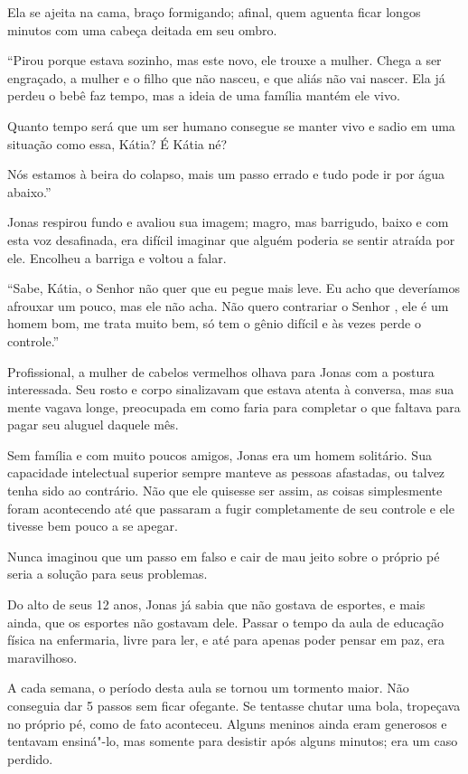 Ela se ajeita na cama, braço formigando; afinal, quem aguenta ficar
longos minutos com uma cabeça deitada em seu ombro.

``Pirou porque estava sozinho, mas este novo, ele trouxe a mulher. Chega
a ser engraçado, a mulher e o filho que não nasceu, e que aliás não vai
nascer. Ela já perdeu o bebê faz tempo, mas a ideia de uma família
mantém ele vivo.

Quanto tempo será que um ser humano consegue se manter vivo e sadio em
uma situação como essa, Kátia? É Kátia né?

Nós estamos à beira do colapso, mais um passo errado e tudo pode ir por
água abaixo.''

Jonas respirou fundo e avaliou sua imagem; magro, mas barrigudo, baixo e
com esta voz desafinada, era difícil imaginar que alguém poderia se
sentir atraída por ele. Encolheu a barriga e voltou a falar.

``Sabe, Kátia, o Senhor  não quer que eu pegue mais leve. Eu acho que
deveríamos afrouxar um pouco, mas ele não acha. Não quero contrariar o
Senhor , ele é um homem bom, me trata muito bem, só tem
o gênio difícil e às vezes perde o controle.''

Profissional, a mulher de cabelos vermelhos olhava para Jonas com a
postura interessada. Seu rosto e corpo sinalizavam que estava atenta à
conversa, mas sua mente vagava longe, preocupada em como faria para
completar o que faltava para pagar seu aluguel daquele mês.

Sem família e com muito poucos amigos, Jonas era um homem solitário. Sua
capacidade intelectual superior sempre manteve as pessoas afastadas, ou
talvez tenha sido ao contrário. Não que ele quisesse ser assim, as
coisas simplesmente foram acontecendo até que passaram a fugir
completamente de seu controle e ele tivesse bem pouco a se apegar.

\asterisc


Nunca imaginou que um passo em falso e cair de mau jeito sobre o próprio
pé seria a solução para seus problemas.

Do alto de seus 12 anos, Jonas já sabia que não gostava de esportes, e
mais ainda, que os esportes não gostavam dele. Passar o tempo da aula de
educação física na enfermaria, livre para ler, e até para apenas poder
pensar em paz, era maravilhoso.

A cada semana, o período desta aula se tornou um tormento maior. Não
conseguia dar 5 passos sem ficar ofegante. Se tentasse chutar uma bola,
tropeçava no próprio pé, como de fato aconteceu. Alguns meninos ainda
eram generosos e tentavam ensiná"-lo, mas somente para desistir após
alguns minutos; era um caso perdido.

